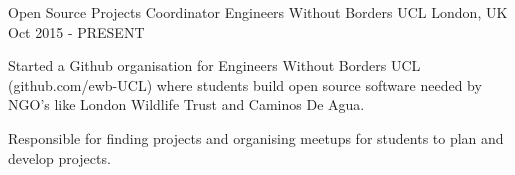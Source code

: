 \begin{cventries}
\cventry
  {Open Source Projects Coordinator}
  {Engineers Without Borders UCL}
  {London, UK}
  {Oct 2015 - PRESENT}
  {
    \begin{cvitems}
      \item {Started a Github organisation for Engineers Without Borders UCL (github.com/ewb-UCL) where students build open source software needed by NGO's like London Wildlife Trust and Caminos De Agua.}
      \item {Responsible for finding projects and organising meetups for students to plan and develop projects.}
    \end{cvitems}
  }

\end{cventries}
